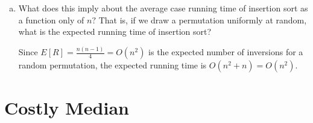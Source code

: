 \documentclass{article}
\begin{document}
\begin{enumerate}[(a)]
	\item What does this imply about the average case running time of insertion sort as a function only of $n?$ That is, if we draw a permutation uniformly at random, what is the expected running time of insertion sort? 
		\begin{soln}
			Since $E[R] = \frac{n(n-1)}{4} = O(n^2)$ is the expected number of inversions for a random permutation, the expected running time is $O(n^2+n) = O(n^2).$
		\end{soln}
		
\end{enumerate}

\section{Costly Median}
 
\end{document}
